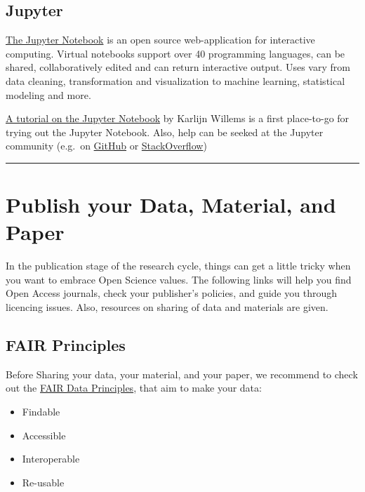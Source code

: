 \documentclass[12pt,]{report}
\providecommand{\tightlist}{%
  \setlength{\itemsep}{0pt}\setlength{\parskip}{0pt}}
\begin{document}
\subsection{Jupyter}\label{jupyter}

\href{https://jupyter.org/}{The Jupyter Notebook} is an open source
web-application for interactive computing. Virtual notebooks support
over 40 programming languages, can be shared, collaboratively edited and
can return interactive output. Uses vary from data cleaning,
transformation and visualization to machine learning, statistical
modeling and more.

\href{https://www.datacamp.com/community/tutorials/tutorial-jupyter-notebook}{A
tutorial on the Jupyter Notebook} by Karlijn Willems is a first
place-to-go for trying out the Jupyter Notebook. Also, help can be
seeked at the Jupyter community (e.g.~on
\href{https://github.com/jupyter/help}{GitHub} or
\href{https://stackoverflow.com/questions/tagged/jupyter}{StackOverflow})

\begin{center}\rule{0.5\linewidth}{\linethickness}\end{center}

\hypertarget{publish}{\section{Publish your Data, Material, and
Paper}\label{publish}}

In the publication stage of the research cycle, things can get a little
tricky when you want to embrace Open Science values. The following links
will help you find Open Access journals, check your publisher's
policies, and guide you through licencing issues. Also, resources on
sharing of data and materials are given.

\subsection{FAIR Principles}\label{fair-principles}

Before Sharing your data, your material, and your paper, we recommend to
check out the
\href{https://www.force11.org/group/fairgroup/fairprinciples}{FAIR Data
Principles}, that aim to make your data:

\begin{itemize}
\tightlist
\item
  Findable
\item
  Accessible
\item
  Interoperable
\item
  Re-usable
\end{itemize}
\end{document}
